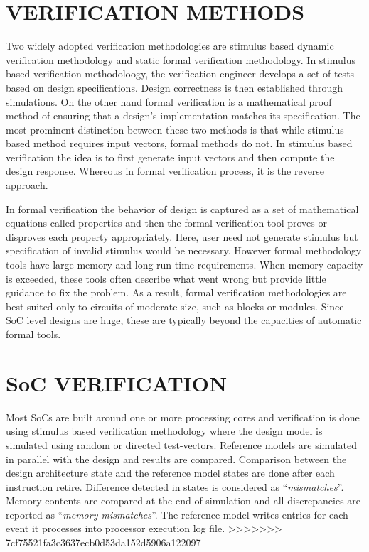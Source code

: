 \section{VERIFICATION METHODS}
Two widely adopted verification methodologies are stimulus based dynamic verification methodology and static formal verification methodology. In stimulus based verification methodoloogy, the verification engineer develops a set of tests based on design specifications. Design correctness is then established through simulations. On the other hand formal verification is a mathematical proof method of ensuring that a design's implementation matches its specification\cite{ieee:segev:2004}. The most prominent distinction between these two methods is that while stimulus based method requires input vectors, formal methods do not. In stimulus based verification the idea is to first generate input vectors and then compute the design response. Whereous in formal verification process, it is the reverse approach.

In formal verification the behavior of design is captured as a set of mathematical equations called properties and then the formal verification tool proves or disproves each property appropriately. Here, user need not generate stimulus but specification of invalid stimulus would be necessary. However formal methodology tools have large memory and long run time requirements. When memory capacity is exceeded, these tools often describe what went wrong but provide little guidance to fix the problem. As a result, formal verification methodologies are best suited only to circuits of moderate size, such as blocks or modules. Since SoC level designs are huge, these are typically beyond the capacities of automatic formal tools\cite{ieee:formal:2004}. 

\section{SoC VERIFICATION}
Most SoCs are built around one or more processing cores and verification is done using stimulus based verification methodology where the design model is simulated using random or directed test-vectors. Reference models are simulated in parallel with the design and results are compared.  Comparison between the design architecture state and the reference model states are done after each instruction retire. Difference detected in states is considered as ``{\it mismatches}''. Memory contents are compared at the end of simulation and all discrepancies are reported as ``{\it memory mismatches}''.  The reference model writes entries for each event it processes into processor execution log file.
>>>>>>> 7cf75521fa3c3637ecb0d53da152d5906a122097

